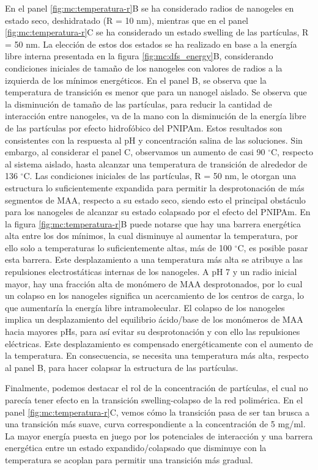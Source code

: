 En el panel \ref{fig:mc:temperatura-r}B se ha considerado radios de nanogeles en estado seco, deshidratado (R = 10 nm), mientras que en el panel \ref{fig:mc:temperatura-r}C se ha considerado un estado swelling de las part\'iculas, R = 50 nm. La elecci\'on de estos dos estados se ha realizado en base a la energ\'ia libre interna presentada en la figura \ref{fig:mc:dfs_energy}B, considerando condiciones iniciales de tama\~no de los nanogeles con valores de radios a la izquierda de los m\'inimos energ\'eticos. En el panel B, se observa que la temperatura de transici\'on es menor que para un nanogel aislado. Se observa que la disminuci\'on de tama\~no de las part\'iculas, para reducir la cantidad de interacci\'on entre nanogeles, va de la mano con la disminuci\'on de la energ\'ia libre de las part\'iculas por efecto hidrof\'obico del PNIPAm. Estos resultados son consistentes con la respuesta al pH y concentraci\'on salina de las soluciones. Sin embargo, al considerar el panel C, observamos un aumento de casi 90 $^\circ$C, respecto al sistema aislado, hasta alcanzar una temperatura de transici\'on de alrededor de 136 $^\circ$C. Las condiciones iniciales de las part\'iculas, R = 50 nm, le otorgan una estructura lo suficientemente expandida para permitir la desprotonaci\'on de m\'as segmentos de MAA, respecto a su estado seco, siendo esto el principal obst\'aculo para los nanogeles de alcanzar su estado colapsado por el efecto del PNIPAm. En la figura \ref{fig:mc:temperatura-r}B puede notarse que hay una barrera energ\'etica alta entre los dos m\'inimos, la cual disminuye al aumentar la temperatura, por ello solo a temperaturas lo suficientemente altas, m\'as de 100 $^\circ$C, es posible pasar esta barrera. Este desplazamiento a una temperatura m\'as alta se atribuye a las repulsiones electrost\'aticas internas de los nanogeles. A pH 7 y un radio inicial mayor, hay una fracci\'on alta de mon\'omero de MAA desprotonados, por lo cual un colapso en los nanogeles significa un acercamiento de los centros de carga, lo que aumentar\'ia la energ\'ia libre intramolecular. El colapso de los nanogeles implica un desplazamiento del equilibrio \'acido/base de los mon\'omeros de MAA hacia mayores pHs, para as\'i evitar su desprotonaci\'on y con ello las repulsiones el\'ectricas. Este desplazamiento es compensado energ\'eticamente con el aumento de la temperatura. En consecuencia, se necesita una temperatura m\'as alta, respecto al panel B, para hacer colapsar la estructura de las part\'iculas.

Finalmente, podemos destacar el rol de la concentraci\'on de part\'iculas, el cual no parec\'ia tener efecto en la transici\'on swelling-colapso de la red polim\'erica. En el panel \ref{fig:mc:temperatura-r}C, vemos c\'omo la transici\'on pasa de ser tan brusca a una transici\'on m\'as suave, curva correspondiente a la concentraci\'on de 5 mg/ml. La mayor energ\'ia puesta en juego por los potenciales de interacci\'on y una barrera energ\'etica entre un estado expandido/colapsado que disminuye con la temperatura se acoplan para permitir una transici\'on m\'as gradual.

